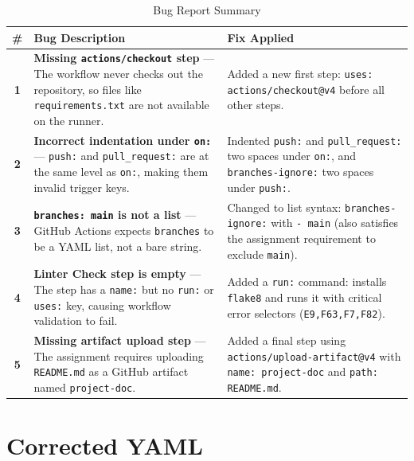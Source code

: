 \documentclass[11pt,a4paper]{article}
\begin{document}
\begin{table}[H]
\centering
\caption{Bug Report Summary}
\begin{tabular}{@{}c p{4.5cm} p{6.5cm}@{}}
\toprule
\textbf{\#} & \textbf{Bug Description} & \textbf{Fix Applied} \\
\midrule
\textcolor{bugred}{\textbf{1}} &
\textcolor{bugred}{\textbf{Missing \texttt{actions/checkout} step}} --- The workflow never checks out the repository, so files like \texttt{requirements.txt} are not available on the runner. &
\textcolor{fixgreen}{Added a new first step:} \texttt{uses: actions/checkout@v4} before all other steps. \\
\addlinespace
\textcolor{bugred}{\textbf{2}} &
\textcolor{bugred}{\textbf{Incorrect indentation under \texttt{on:}}} --- \texttt{push:} and \texttt{pull\_request:} are at the same level as \texttt{on:}, making them invalid trigger keys. &
\textcolor{fixgreen}{Indented \texttt{push:} and \texttt{pull\_request:}} two spaces under \texttt{on:}, and \texttt{branches-ignore:} two spaces under \texttt{push:}. \\
\addlinespace
\textcolor{bugred}{\textbf{3}} &
\textcolor{bugred}{\textbf{\texttt{branches: main} is not a list}} --- GitHub Actions expects \texttt{branches} to be a YAML list, not a bare string. &
\textcolor{fixgreen}{Changed to list syntax:} \texttt{branches-ignore:} with \texttt{- main} (also satisfies the assignment requirement to exclude \texttt{main}). \\
\addlinespace
\textcolor{bugred}{\textbf{4}} &
\textcolor{bugred}{\textbf{Linter Check step is empty}} --- The step has a \texttt{name:} but no \texttt{run:} or \texttt{uses:} key, causing workflow validation to fail. &
\textcolor{fixgreen}{Added a \texttt{run:} command:} installs \texttt{flake8} and runs it with critical error selectors (\texttt{E9,F63,F7,F82}). \\
\addlinespace
\textcolor{bugred}{\textbf{5}} &
\textcolor{bugred}{\textbf{Missing artifact upload step}} --- The assignment requires uploading \texttt{README.md} as a GitHub artifact named \texttt{project-doc}. &
\textcolor{fixgreen}{Added a final step} using \texttt{actions/upload-artifact@v4} with \texttt{name: project-doc} and \texttt{path: README.md}. \\
\bottomrule
\end{tabular}
\end{table}

\section{Corrected YAML}
\end{document}
